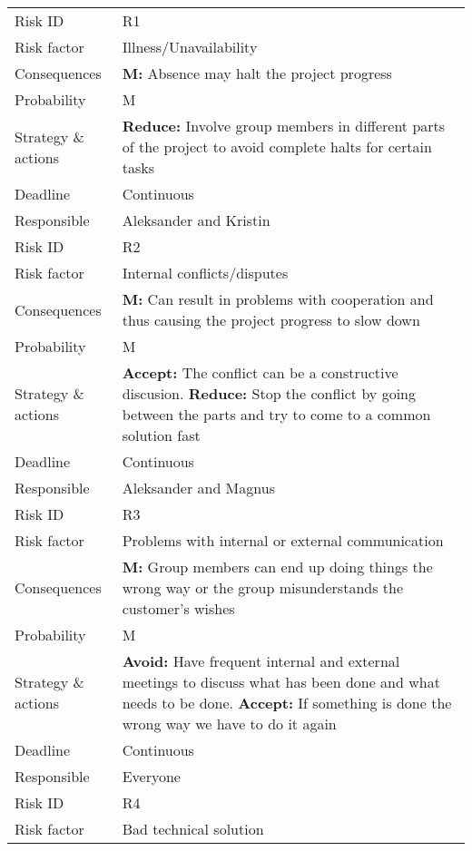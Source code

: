 \documentclass[12pt]{report}
\begin{document}
\begin{table}
\begin{tabularx}{\linewidth}{>{\setlength\hsize{.4\hsize}}X>{\setlength\hsize{0.6\hsize}}X}\hline
Risk ID & R1 \\
Risk factor & Illness/Unavailability \\
Consequences & \textbf{M:} Absence may halt the project progress \\
Probability & M \\
Strategy \& actions & \textbf{Reduce:} Involve group members in different parts of the project to avoid complete halts for certain tasks \\
Deadline & Continuous \\
Responsible & Aleksander and Kristin \\ \hline
Risk ID & R2 \\
Risk factor & Internal conflicts/disputes \\
Consequences & \textbf{M:} Can result in problems with cooperation and thus causing the project progress to slow down \\
Probability & M \\
Strategy \& actions & \textbf{Accept:} The conflict can be a constructive discusion. \textbf{Reduce:} Stop the conflict by going between the parts and try to come to a common solution fast \\
Deadline & Continuous \\
Responsible & Aleksander and Magnus\\ \hline
Risk ID & R3 \\
Risk factor & Problems with internal or external communication \\
Consequences & \textbf{M:} Group members can end up doing things the wrong way or the group misunderstands the customer's wishes \\
Probability & M \\
Strategy \& actions & \textbf{Avoid:} Have frequent internal and external meetings to discuss what has been done and what needs to be done. \textbf{Accept:} If something is done the wrong way we have to do it again \\
Deadline & Continuous \\
Responsible & Everyone \\ \hline
Risk ID & R4 \\
Risk factor & Bad technical solution \\

\end{tabularx}
\end{table}
\end{document}
